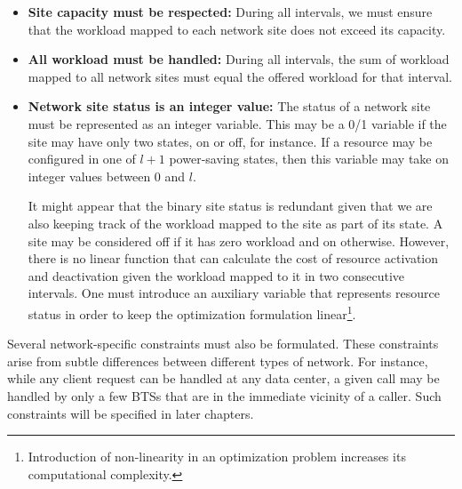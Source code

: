 \begin{itemize}
\item \textbf{Site capacity must be respected:} During all intervals, we must ensure that the workload mapped to each network site does not exceed its capacity.
\item \textbf{All workload must be handled:} During all intervals, the sum of workload mapped to all network sites must equal the offered workload for that interval.
\item \textbf{Network site status is an integer value:} The status of a network site must be represented as an integer variable. This may be a 0/1 variable if the site may have only two states, on or off, for instance. If a resource may be configured in one of $l+1$ power-saving states, then this variable may take on integer values between $0$ and $l$. 

It might appear that the binary site status is redundant given that we are also keeping track of the workload mapped to the site as part of its state. A site may be considered off if it has zero workload and on otherwise. However, there is no linear function that can calculate the cost of resource activation and deactivation given the workload mapped to it in two consecutive intervals. One must introduce an auxiliary variable that represents resource status in order to keep the optimization formulation linear\footnote{Introduction of non-linearity in an optimization problem increases its computational complexity.}. 
\end{itemize}

Several network-specific constraints must also be formulated. These constraints arise from subtle differences between different types of network. For instance, while any client request can be handled at any data center, a given call may be handled by only a few BTSs that are in the immediate vicinity of a caller. Such constraints will be specified in later chapters.

